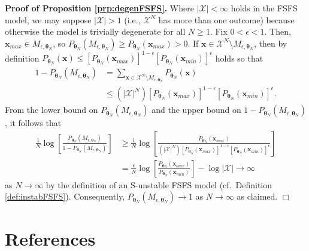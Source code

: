 \documentclass[12pt]{article}
\theoremstyle{definition}
\begin{document}
\textbf{Proof of Proposition \ref{prp:degenFSFS}.} Where
\(|\mathcal{X}|<\infty\) holds in the FSFS model, we may suppose
\(|\mathcal{X}|>1\) (i.e., \(\mathcal{X}^N\) has more than one outcome)
because otherwise the model is trivially degenerate for all
\(N \geq 1\). Fix \(0 < \epsilon < 1\). Then,
\(\boldsymbol x_{max} \in M_{\epsilon, \boldsymbol \theta_N}\), so
\(P_{\boldsymbol \theta_N}(M_{\epsilon, \boldsymbol \theta_N}) \ge P_{\boldsymbol \theta_N}(\boldsymbol x_{max}) > 0\).
If
\(\boldsymbol x \in \mathcal{X}^N \setminus M_{\epsilon, \boldsymbol \theta_N}\),
then by definition
\(P_{\boldsymbol \theta_N}(\boldsymbol x) \le [P_{\boldsymbol \theta_N}(\boldsymbol x_{max})]^{1-\epsilon}[P_{\boldsymbol \theta_N}(\boldsymbol x_{min})]^{\epsilon}\)
holds so that
\begin{align*}
1-P_{\boldsymbol \theta_N}(M_{\epsilon, \boldsymbol \theta_N})
& = \sum\limits_{\boldsymbol x \in \mathcal{X}^N \setminus M_{\epsilon, \boldsymbol \theta_N}}P_{\boldsymbol \theta_N}(\boldsymbol x) \\
& \le (|\mathcal{X}|^N)[P_{\boldsymbol \theta_N}(\boldsymbol x_{max})]^{1-\epsilon}[P_{\boldsymbol \theta_N}(\boldsymbol x_{min})]^{\epsilon}.
\end{align*}
From the lower bound on
\(P_{\boldsymbol \theta_N}(M_{\epsilon, \boldsymbol \theta_N})\) and the
upper bound on
\(1-P_{\boldsymbol \theta_N}(M_{\epsilon, \boldsymbol \theta_N})\), it
follows that
\begin{align*}
\frac{1}{N}\log\left[\frac{P_{\boldsymbol \theta_N}(M_{\epsilon, \boldsymbol \theta_N})}{1-P_{\boldsymbol \theta_N}(M_{\epsilon, \boldsymbol \theta_N})}\right] & \ge \frac{1}{N} \log\left[\frac{P_{\boldsymbol\theta_N}(\boldsymbol x_{max})}{(|\mathcal{X}|^N)[P_{\boldsymbol \theta_N}(\boldsymbol x_{max})]^{1-\epsilon}[P_{\boldsymbol \theta_N}(\boldsymbol x_{min})]^{\epsilon}}\right] \\
&= \frac{\epsilon}{N} \log\left[\frac{P_{\boldsymbol \theta_N}(\boldsymbol x_{max})}{P_{\boldsymbol \theta_N}(\boldsymbol x_{min})}\right] - \log |\mathcal{X}| \rightarrow \infty
\end{align*}
as \(N \rightarrow \infty\) by the definition of an S-unstable FSFS
model (cf.~Definition \ref{def:instabFSFS}). Consequently,
\(P_{\boldsymbol \theta_N}(M_{\epsilon, \boldsymbol \theta_N}) \rightarrow 1\)
as \(N \rightarrow \infty\) as claimed. \hfill \(\Box\)

\clearpage

\section*{References}\label{references}
\end{document}

